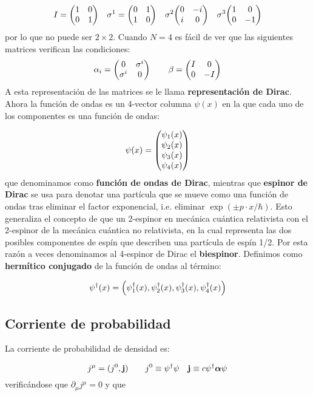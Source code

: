 \begin{equation}
	I=\mqty(\pmat{0}) \quad \sigma^1= \mqty(\pmat{1}) \quad \sigma^2 \mqty(\pmat{2}) \quad \sigma^3 \mqty(\pmat{3})
\end{equation}
por lo que no puede ser $2\times2$. Cuando $N=4$ es fácil de ver que las siguientes  matrices verifican las condiciones:
\begin{equation}
	\alpha_i =\begin{pmatrix}
		0 & \sigma^i \\ \sigma^i & 0
	\end{pmatrix} \qquad \beta=\mqty(\dmat[0]{I,-I})
\end{equation} 
A esta representación de las matrices se le llama \textbf{representación de Dirac}. Ahora la función de ondas es un 4-vector columna $\psi(x)$ en la que cada uno de los componentes es una función de ondas:

\begin{equation}
	\psi(x) = \mqty(\psi_1 (x) \\ \psi_2 (x) \\ \psi_3(x) \\ \psi_4 (x))
\end{equation}
que denominamos como \textbf{función de ondas de Dirac}, mientras que \textbf{espinor de Dirac} se usa para denotar una partícula que se mueve como una función de ondas tras eliminar el factor exponencial, i.e. eliminar $\exp(\pm p\cdot x/\hbar)$. Esto generaliza el concepto de que un 2-espinor en mecánica cuántica relativista con el 2-espinor de la mecánica cuántica no relativista, en la cual representa las dos posibles componentes de espín que describen una partícula de espín 1/2. Por esta razón a veces denominamos al 4-espinor de Dirac el \textbf{biespinor}. Definimos como \textbf{hermítico conjugado} de la función de ondas al término:

\begin{equation}
	\psi^\dagger(x) = \left( \psi_1^\dagger (x) , \psi_2^\dagger (x) ,\psi_3^\dagger(x) , \psi_4^\dagger (x) \right)
\end{equation}
\subsection{Corriente de probabilidad}

La corriente de probabilidad de densidad es:

\begin{equation}
	j^\mu = (j^0,\mathbf{j}) \qquad j^0 \equiv \psi^\dagger \psi \quad \mathbf{j} \equiv c \psi^\dagger \boldsymbol{\alpha} \psi
\end{equation}
verificándose que $\partial_\mu j^\mu = 0$ y que 

